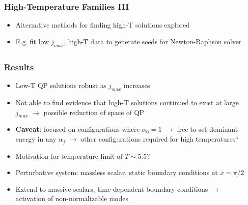 \documentclass[mathserif,10pt]{beamer}
\newcommand{\bi}{\begin{itemize}}
\newcommand{\ei}{\end{itemize}}
\newcommand{\its}{\item}
\newcommand{\jm}{j_{max}}
\begin{document}
{\frame
{
  \frametitle{High-Temperature Families III}
  \bi
  \its Alternative methods for finding high-T solutions explored 
  \its E.g. fit low $\jm$, high-T data to generate seeds for Newton-Raphson solver
     \ei
   \begin{overlayarea}{\textwidth}{0.65\textheight}
      \begin{figure}
      \centering
      \end{figure}
  \end{overlayarea}
}


\subsection*{}
\frame
{
  \frametitle{Results}
    \bi
    \its Low-T QP solutions robust as $\jm$ increases
    \its Not able to find evidence that high-T solutions continued to exist at large $\jm$ $\to$ possible reduction of space of QP
    \its {\bf Caveat}: focused on configurations where $\alpha_0 = 1$ $\to$ free to set dominant energy in any $\alpha_j$ $\to$ other configurations required for high temperatures?
    \its Motivation for temperature limit of $T \sim 5.5$?
    \its Perturbative system: massless scalar, static boundary conditions at $x = \pi/2$
    \its Extend to massive scalars, time-dependent boundary conditions $\to$ activation of non-normalizable modes
    \ei
}

}
\end{document}
